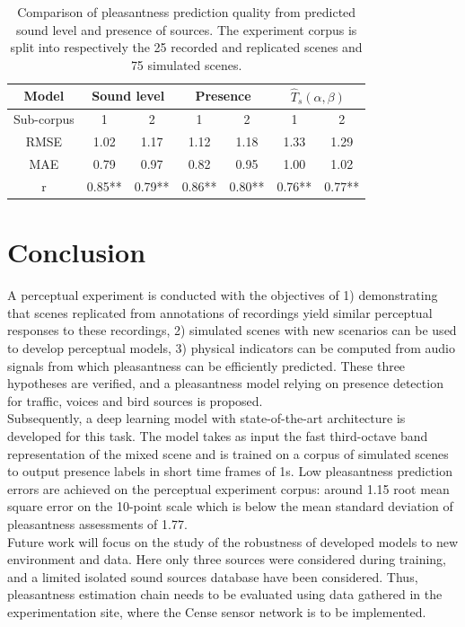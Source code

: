 \documentclass[11pt,a4paper]{article}
\begin{document}
\begin{table}[t]
\centering
\caption{Comparison of pleasantness prediction quality from predicted sound level and presence of sources. The experiment corpus is split into respectively the 25 recorded and replicated scenes and 75 simulated scenes.}
\label{tab:pppred}
\begin{tabular}{ c | c c | c c | c c }
\hline
	Model & \multicolumn{2}{|c}{Sound level} & \multicolumn{2}{|c}{Presence} & \multicolumn{2}{|c}{$\hat T_s(\alpha, \beta)$} \\ \hline
	Sub-corpus & 1 & 2 & 1 & 2 & 1 & 2 \\ \hline
	RMSE & 1.02 & 1.17 & 1.12 & 1.18 & 1.33 & 1.29 \\
	MAE & 0.79 & 0.97 & 0.82 & 0.95 & 1.00 & 1.02 \\ \hline
	r & 0.85** & 0.79** & 0.86** & 0.80** & 0.76** & 0.77** \\ \hline
\end{tabular}
\end{table}




\section{Conclusion}

A perceptual experiment is conducted with the objectives of 1) demonstrating that scenes replicated from annotations of recordings yield similar perceptual responses to these recordings, 2) simulated scenes with new scenarios can be used to develop perceptual models, 3) physical indicators can be computed from audio signals from which pleasantness can be efficiently predicted. These three hypotheses are verified, and a pleasantness model relying on presence detection for traffic, voices and bird sources is proposed.\\

Subsequently, a deep learning model with state-of-the-art architecture is developed for this task. The model takes as input the fast third-octave band representation of the mixed scene and is trained on a corpus of simulated scenes to output presence labels in short time frames of 1s. Low pleasantness prediction errors are achieved on the perceptual experiment corpus: around 1.15 root mean square error on the 10-point scale which is below the mean standard deviation of pleasantness assessments of 1.77.\\

Future work will focus on the study of the robustness of developed models to new environment and data. Here only three sources were considered during training, and a limited isolated sound sources database have been considered. Thus, pleasantness estimation chain needs to be evaluated using data gathered in the experimentation site, where the Cense sensor network is to be implemented.
\end{document}
